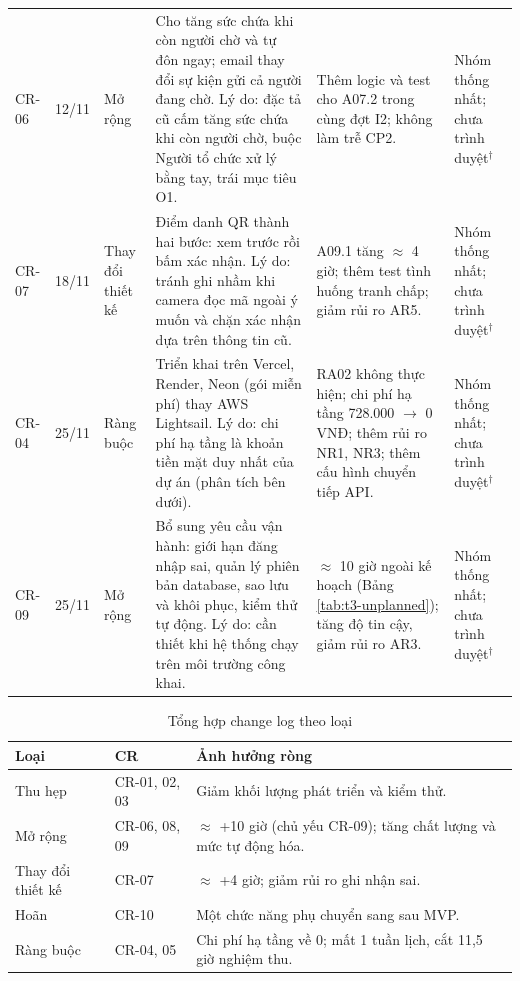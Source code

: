 \begin{longtable}{@{}p{.06\linewidth}p{.07\linewidth}p{.10\linewidth}p{.27\linewidth}p{.29\linewidth}p{.13\linewidth}@{}}
CR-06 & 12/11 & Mở rộng & Cho tăng sức chứa khi còn người chờ và tự đôn ngay; email thay đổi sự kiện gửi cả người đang chờ. Lý do: đặc tả cũ cấm tăng sức chứa khi còn người chờ, buộc Người tổ chức xử lý bằng tay, trái mục tiêu O1. & Thêm logic và test cho A07.2 trong cùng đợt I2; không làm trễ CP2. & Nhóm thống nhất; chưa trình duyệt$^{\dagger}$\\
CR-07 & 18/11 & Thay đổi thiết kế & Điểm danh QR thành hai bước: xem trước rồi bấm xác nhận. Lý do: tránh ghi nhầm khi camera đọc mã ngoài ý muốn và chặn xác nhận dựa trên thông tin cũ. & A09.1 tăng $\approx$ 4 giờ; thêm test tình huống tranh chấp; giảm rủi ro AR5. & Nhóm thống nhất; chưa trình duyệt$^{\dagger}$\\
CR-04 & 25/11 & Ràng buộc & Triển khai trên Vercel, Render, Neon (gói miễn phí) thay AWS Lightsail. Lý do: chi phí hạ tầng là khoản tiền mặt duy nhất của dự án (phân tích bên dưới). & RA02 không thực hiện; chi phí hạ tầng 728.000 $\to$ 0 VNĐ; thêm rủi ro NR1, NR3; thêm cấu hình chuyển tiếp API. & Nhóm thống nhất; chưa trình duyệt$^{\dagger}$\\
CR-09 & 25/11 & Mở rộng & Bổ sung yêu cầu vận hành: giới hạn đăng nhập sai, quản lý phiên bản database, sao lưu và khôi phục, kiểm thử tự động. Lý do: cần thiết khi hệ thống chạy trên môi trường công khai. & $\approx$ 10 giờ ngoài kế hoạch (Bảng \ref{tab:t3-unplanned}); tăng độ tin cậy, giảm rủi ro AR3. & Nhóm thống nhất; chưa trình duyệt$^{\dagger}$\\
\end{longtable}
\endgroup


\begin{table}[H]
\centering\small
\caption{Tổng hợp change log theo loại}\label{tab:t3-cr-summary}
\begin{tabularx}{\linewidth}{@{}p{.20\linewidth}p{.18\linewidth}X@{}}
\toprule
\textbf{Loại} & \textbf{CR} & \textbf{Ảnh hưởng ròng}\\\midrule
Thu hẹp & CR-01, 02, 03 & Giảm khối lượng phát triển và kiểm thử.\\
Mở rộng & CR-06, 08, 09 & $\approx$ +10 giờ (chủ yếu CR-09); tăng chất lượng và mức tự động hóa.\\
Thay đổi thiết kế & CR-07 & $\approx$ +4 giờ; giảm rủi ro ghi nhận sai.\\
Hoãn & CR-10 & Một chức năng phụ chuyển sang sau MVP.\\
Ràng buộc & CR-04, 05 & Chi phí hạ tầng về 0; mất 1 tuần lịch, cắt 11,5 giờ nghiệm thu.\\
\bottomrule
\end{tabularx}
\end{table}

